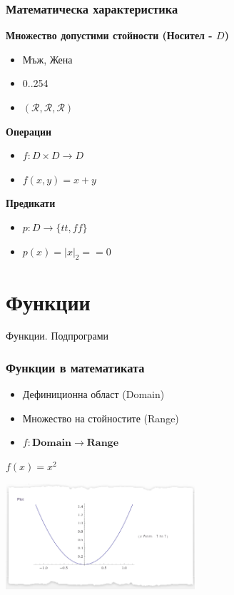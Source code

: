 \documentclass{beamer}
\begin{document}
\begin{frame}[fragile]
\frametitle{Математическа характеристика}


\textbf{Множество допустими стойности (Носител - $D$)}

\pause

\begin{itemize}
  \item Мъж, Жена
  \item 0..254
  \item $(\mathcal{R},\mathcal{R},\mathcal{R})$
\end{itemize}

\pause

\textbf{Операции}

\begin{itemize}
  \item $f:D\times D \rightarrow D$
  \item $f(x,y)=x+y$
\end{itemize}


\pause

\textbf{Предикати}

\begin{itemize}
  \item $p:D \rightarrow \{tt,ff\}$
  \item $p(x)=|x|_2==0$
\end{itemize}


\end{frame}


\section{Функции} 

\begin{frame}
\centerline{Функции. Подпрограми}
\end{frame}

\begin{frame}[fragile]
\frametitle{Функции в математиката}


\begin{itemize}
  \item Дефиниционна област (Domain)
  \item Множество на стойностите (Range) 
  \item $f:\mathbf{Domain} \rightarrow \mathbf{Range}$
\end{itemize}


\vspace{0.2cm}
$f(x) = x^2$

\begin{center}
\includegraphics[width=7cm]{images/square}  
\end{center}


\end{frame}
\end{document}
